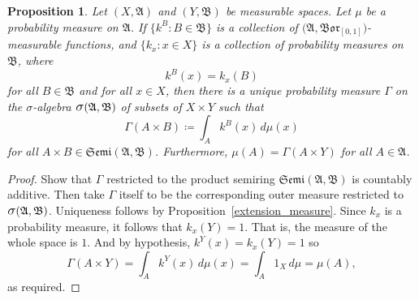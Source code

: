 \documentclass[
twoside=true,
paper=letter,
fontsize=11pt,
pagesize=auto,
leqno,
openany,
headsepline,
overfullrule,
]{scrbook}
\theoremstyle{plain}
\theoremstyle{plain}
\newtheorem{prop}[thm]{Proposition}
\theoremstyle{definition}
\theoremstyle{bfnoteitalic}
\theoremstyle{bfnoteroman}
\newcommand{\sigalg}[1]{\mathfrak{#1}}
\newcommand{\definedby}{\coloneqq}
\newcommand{\borel}{\mathfrak{Bor}}
\newcommand{\sagb}{\mathop{\hbox{\large{$\sigma$}}}\nolimits}
\newcommand{\textsigma}{\hbox{\large{$\sigma$}}\kern-1pt}
\newcommand{\sigmaalgebra}{\sigalg{A}}
\newcommand{\sigmaalgebraii}{\sigalg{B}}
\newcommand{\productsemiring}[2]{\mathfrak{Semi}(#1,#2)}
\newcommand{\funck}{k}
\newcommand{\measurespace}{X}
\newcommand{\measurespaceii}{Y}
\newcommand{\mspaceelt}{x}
\newcommand{\measure}{\mu}
\newcommand{\seti}{A}
\newcommand{\setii}{B}
\newcommand{\measonprod}{\Gamma}%
\begin{document}
\begin{prop}\label{not_a_product_measure}
Let
$(\measurespace, \sigmaalgebra)$ and 
$(\measurespaceii, \sigmaalgebraii)$ be measurable spaces.
Let $\measure$ be a probability measure on $\sigmaalgebra$.
If
$\{ \funck^\setii : \setii\in\sigmaalgebraii \}$
is a collection of
$\bigl(\sigmaalgebra, \borel_{[0,1]}\bigr)$\hyp{}measurable functions,
and
$\{ \funck_\mspaceelt : \mspaceelt\in\measurespace \}$
is a collection of probability measures on $\sigmaalgebraii$,
where
\[
\funck^\setii (\mspaceelt) = \funck_\mspaceelt (\setii)
\]
for all
$\setii\in\sigmaalgebraii$
and for all
$\mspaceelt\in\measurespace$,
then there is a unique probability measure $\measonprod$ on the \textsigma-algebra 
$\sagb(\sigmaalgebra,\sigmaalgebraii)$ of subsets of 
$\measurespace\times\measurespaceii$
such that
\[
\measonprod(\seti\times\setii)
\definedby
\int_\seti \funck^\setii(\mspaceelt) \, d\measure(\mspaceelt)
\]
for all $\seti\times\setii\in\productsemiring{\sigmaalgebra}{\sigmaalgebraii}$.
Furthermore,
$\measure(\seti) = \measonprod(\seti\times\measurespaceii)$ for all $\seti\in\sigmaalgebra$.
\end{prop}


\begin{proof}
Show that  $\measonprod$ restricted to the product semiring
$\productsemiring{\sigmaalgebra}{\sigmaalgebraii}$ is countably additive.
Then take $\measonprod$ itself to be the corresponding outer measure restricted to 
$\sagb(\sigmaalgebra,\sigmaalgebraii)$. 
Uniqueness follows by Proposition~\ref{extension_measure}.
Since $\funck_\mspaceelt$ is a probability measure, it follows that
$\funck_\mspaceelt(\measurespaceii) = 1$. That is, the measure of the whole space is $1$.
And by hypothesis,
$\funck^\measurespaceii(\mspaceelt)
=
\funck_\mspaceelt(\measurespaceii)
= 1$
so
\[
\measonprod(\seti\times\measurespaceii)
=
\int_\seti \funck^\measurespaceii (\mspaceelt)
\, d\measure(\mspaceelt)
=
\int_\seti 1_\measurespace \, d\measure
=\measure(\seti),
\]
as required.
\end{proof}
\end{document}
